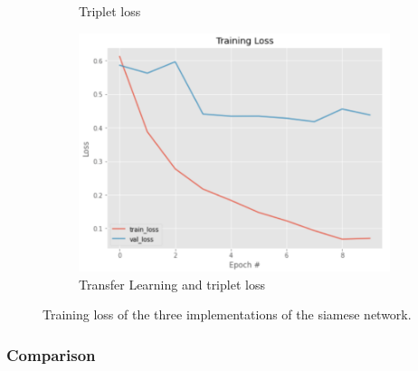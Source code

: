 \begin{figure}[h]
\begin{subfigure}[b]{0.48\linewidth}
   \caption{Triplet loss}
   \label{fig:tri_loss}
  \end{subfigure}
    \hfill
    \begin{subfigure}[b]{0.48\linewidth}
   \includegraphics[width=\linewidth]{figs/tri_loss_2.png}
   \caption{Transfer Learning and triplet loss}
   \label{fig:tri_loss_2}
  \end{subfigure}
  \hfill
    \caption{Training loss of the three implementations of the siamese network.}
    \label{fig:siatrainloss}
\end{figure}

\subsubsection{Comparison}

